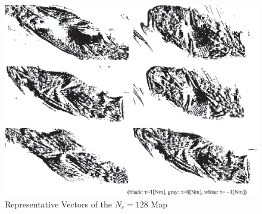 \begin{figure}[h]
        \begin{center}
        \includegraphics[width=1.0\linewidth]{figs/vq_map_128part.eps}
        \caption{Representative Vectors of the $N_c = 128$ Map}
        \label{fig:vq_map_128part}
        \end{center}
\end{figure}




